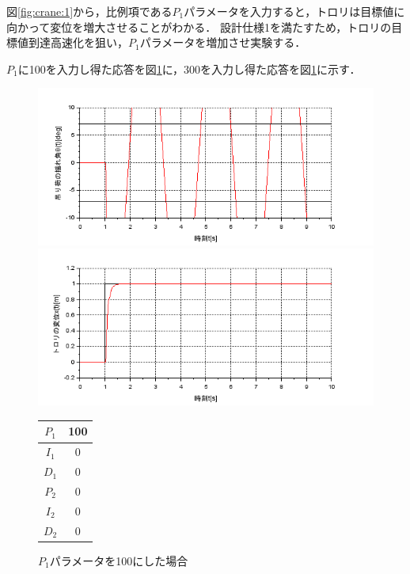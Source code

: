 \documentclass[dvipdfmx,titlepage,a4j]{jsarticle}  %
\begin{document}
図\ref{fig:crane:1}から，比例項である$P_1$パラメータを入力すると，トロリは目標値に向かって変位を増大させることがわかる．
設計仕様1を満たすため，トロリの目標値到達高速化を狙い，$P_1$パラメータを増加させ実験する．

$P_1$に100を入力し得た応答を図\ref{fig:crane:2}に，300を入力し得た応答を図\ref{fig:crane:2}に示す．

\begin{figure}[H]
  \begin{minipage}{4.5cm}
    \centering
    \includegraphics[keepaspectratio, scale=0.35]{../graph/crane/ang-P1-100-I1-0-D1-0-P2-0-I2-0-D2-0.png}
  \end{minipage}
  \hfill
  \begin{minipage}{4.5cm}
    \centering
    \includegraphics[keepaspectratio, scale=0.35]{../graph/crane/po-P1-100-I1-0-D1-0-P2-0-I2-0-D2-0.png}
  \end{minipage}
  \hfill
  \begin{minipage}{3cm}
    \begin{center}
      \begin{tabular}{c|c}
        \hline
        $P_1$ & 100 \\ \hline
        $I_1$ & 0   \\ \hline
        $D_1$ & 0   \\ \hline
        $P_2$ & 0   \\ \hline
        $I_2$ & 0   \\ \hline
        $D_2$ & 0   \\
        \hline
      \end{tabular}
    \end{center}
  \end{minipage}
  \hfill
  \caption{$P_1$パラメータを100にした場合}
  \label{fig:crane:2}
\end{figure}
\end{document}
